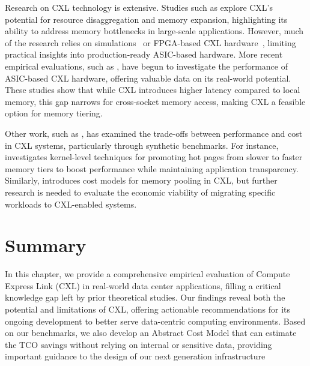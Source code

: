 Research on CXL technology is extensive. Studies such as \cite{cxl_azure, cxlcentric, demystify} explore CXL’s potential for resource disaggregation and memory expansion, highlighting its ability to address memory bottlenecks in large-scale applications. However, much of the research relies on simulations~\cite{pond, cxlcentric} or FPGA-based CXL hardware~\cite{demystify, intelfpga, directcxl}, limiting practical insights into production-ready ASIC-based hardware. More recent empirical evaluations, such as \cite{demystify, smt}, have begun to investigate the performance of ASIC-based CXL hardware, offering valuable data on its real-world potential. These studies show that while CXL introduces higher latency compared to local memory, this gap narrows for cross-socket memory access, making CXL a feasible option for memory tiering.

Other work, such as \cite{pond, tpp, directcxl}, has examined the trade-offs between performance and cost in CXL systems, particularly through synthetic benchmarks. For instance, \cite{tpp} investigates kernel-level techniques for promoting hot pages from slower to faster memory tiers to boost performance while maintaining application transparency. Similarly, \cite{CXLPoolCost} introduces cost models for memory pooling in CXL, but further research is needed to evaluate the economic viability of migrating specific workloads to CXL-enabled systems.

\section{Summary}

In this chapter, we provide a comprehensive empirical evaluation of Compute Express Link (CXL) in real-world data center applications, filling a critical knowledge gap left by prior theoretical studies. Our findings reveal both the potential and limitations of CXL, offering actionable recommendations for its ongoing development to better serve data-centric computing environments. Based on our benchmarks, we also develop an Abstract Cost Model that can estimate the TCO savings without relying on internal or sensitive data, providing important guidance to the design of our next generation infrastructure
